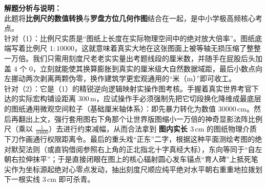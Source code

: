 \documentclass[12pt, a4paper]{ctexrep}
\begin{document}
{\small\color{gray}
\textbf{解题分析与说明：}\\
此题将\textbf{比例尺的数值转换}与\textbf{罗盘方位几何作图}结合在一起，是中小学极高频核心考点。\\
针对（1）：比例尺实质是“图纸上长度在实际物理空间中的绝对放大倍率”。图纸底端写着比例尺 $1:10000$，这就意味着真实大地在这张图面上被等轴无损压缩了整整一万倍。我们只需用刻度尺老老实实量出考题线段的厘米数，并随手在屁股后头加盖 $4$ 个 $0$，立刻就能使其换算膨胀到真实的厘米级大自然数据域距，最后小数点向左挪动两次剥离两颗伪零，换作建筑学更宏观通用的“米（$\text{m}$）”即可收工。\\
针对（2）：它是（1）的精锐逆向逻辑映射实操作图考核。手握着真实世界考官下达的实际宏构铺设距离 $300\,\text{m}$，应试操作手必须强制先把它切段换化降维成最底层的图纸通用微观空间粒子（基础厘米轴体系）：即先暴力转化为数值 $30000\,\text{cm}$。然后再翻出上文，强行套用图右下角那个让世界版图缩小一万倍的神奇显影法阵比例尺（乘以 $\frac{1}{10000}$）去进行约束减幅，从而合法拿到 \textbf{图内实长 $3\,\text{cm}$} 的图纸物理介质下刀作画通行权限距离令。最后的重头戏“正东”二字，根据这种平面测绘考图的绝对默契法则（或直钩借阅参照右上角的正北指北十字真经大标），东向等同于“自左朝右拉伸抹平”；于是直接闭眼在图上的核心辐射圆心发车锚点“育人碑”上抵死笔尖作为坐标源起绝对心零点发动，抽出刻度尺顺应纯平绝对水平朝右重重地拉拨划下一根实线 $3\,\text{cm}$ 即可杀青。
}

\vspace{0.6cm}
\end{document}
